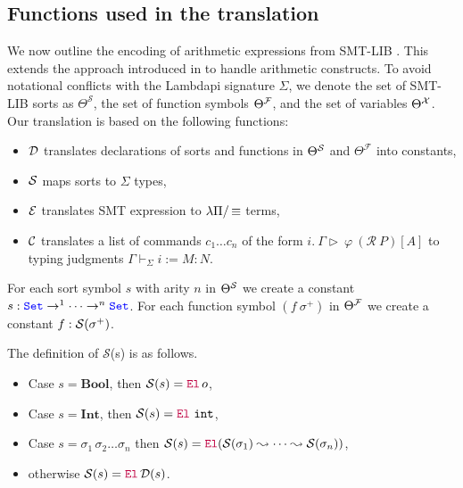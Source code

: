 \subsection{Functions used in the translation}

We now outline the encoding of arithmetic expressions from SMT-LIB \cite[\S 5.2.1]{smtlib}. This extends the approach introduced in \cite{ColtellacciMD24} to handle arithmetic constructs.
To avoid notational conflicts with the Lambdapi signature $\Sigma$, we denote the set of SMT-LIB sorts as $\Theta^\mathcal{S}$, the set of function symbols $\Theta^\cal{F}$, and the set of variables $\Theta^\cal{X}$.
Our translation is based on the following functions:

\begin{itemize}
\item $\cal{D}$ translates declarations of sorts and functions in $\Theta^\cal{S}$ and $\Theta^\mathcal{F}$ into constants,
\item $\cal{S}$ maps sorts to $\Sigma$ types,
\item $\cal{E}$ translates SMT expression to $\lpm$ terms,
\item $\cal{C}$ translates a list of commands  $c_1 \dots c_n$ of the form $i.~\Gamma \triangleright~\varphi~(\mathcal{R}~P)[A]$ to typing judgments $\Gamma \vdash_\Sigma i := M: N$.
\end{itemize}

\begin{definition}
For each sort symbol $s$ with arity $n$ in $\Theta^\cal{S}$ we create a constant $s: \set \ra^1 \dots \ra^{n} \set$.
For each function symbol $(f~\sigma^+)$ in $\Theta^\cal{F}$ we create a constant $f: \cal{S}(\sigma^+)$.
\end{definition}

\begin{definition} 
  The definition of $\mathcal{S}$(s) is as follows.
  \begin{itemize}
    \item Case $s = \textbf{Bool}$, then $\Sort{s} = \el\,o$,
    \item Case $s = \textbf{Int}$, then $\Sort{s} = \el~\texttt{int}$,
    \item Case $s = \sigma_1\,\sigma_2 \dots \sigma_n$ then $\Sort{s} = \el{} (\mathcal{S}(\sigma_1) \leadsto \dots \leadsto \mathcal{S}(\sigma_n))$,
    \item otherwise $\Sort{s} = \el\, \mathcal{D}(s)$.
  \end{itemize}
\end{definition}


